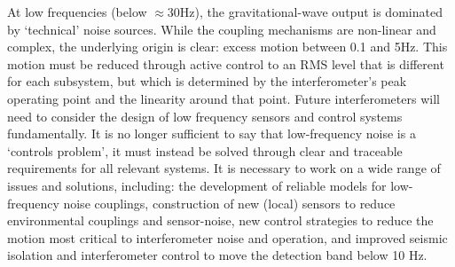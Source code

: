 \par
{}
At low frequencies (below $\approx$30Hz), the gravitational-wave output is dominated by `technical' noise sources. While the coupling mechanisms are non-linear and complex, the underlying origin is clear: excess motion between 0.1 and 5Hz. This motion must be reduced through active control to an RMS level that is different for each subsystem, but which is determined by the interferometer's peak operating point and the linearity around that point.
Future interferometers will need to consider the design of low frequency sensors and control systems fundamentally. It is no longer sufficient to say that low-frequency noise is a `controls problem', it must instead be solved through clear and traceable requirements for all relevant systems. 
It is necessary to work on a wide range of issues and solutions, including: the development of reliable models for low-frequency noise couplings, construction of new (local) sensors 
to reduce environmental couplings and sensor-noise, new control strategies to reduce the motion most critical to interferometer noise and operation, and improved seismic isolation and interferometer control to move the detection band below 10 Hz.


